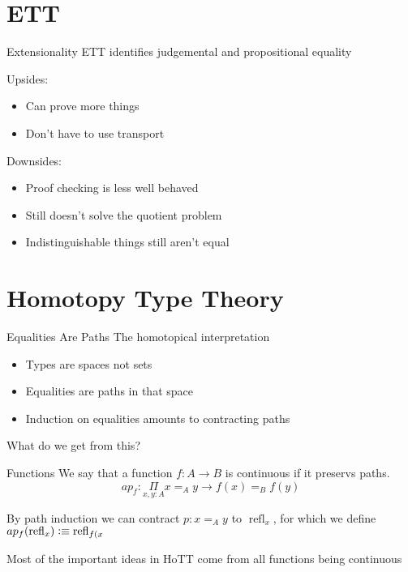 \documentclass[xcolor=svgnames]{beamer}
\DeclareMathOperator{\refl}{refl}
\newcommand{\defeq}{\vcentcolon\equiv}
\begin{document}
\section{ETT}

\begin{frame}{Extensionality}
  ETT identifies judgemental and propositional equality \pause

  Upsides:
  \begin{itemize}
  \item Can prove more things
  \item Don't have to use transport
  \end{itemize} \pause

  Downsides:
  \begin{itemize}
  \item Proof checking is less well behaved
  \item Still doesn't solve the quotient problem
  \item Indistinguishable things still aren't equal
  \end{itemize}
\end{frame}

\section{Homotopy Type Theory}

\begin{frame}{Equalities Are Paths}
  The homotopical interpretation
  \begin{itemize}
  \item Types are spaces not sets
  \item Equalities are paths in that space
  \item Induction on equalities amounts to contracting paths
  \end{itemize}

  What do we get from this? %
\end{frame}

\begin{frame}{Functions}
  We say that a function $f : A \to B$ is continuous if it preservs paths.
  $$ ap_f : \underset{x,y:A}\Pi x =_A y \to f(x) =_B f(y) $$ \pause

  By path induction we can contract $p : x =_A y$ to $\refl_x$, for which we define
  $ap_f(\refl_x) \defeq \refl_{f(x}$ \pause

  Most of the important ideas in HoTT come from all functions being continuous
\end{frame}
\end{document}
